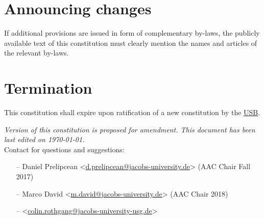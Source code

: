 \section{Announcing changes}
If additional provisions are issued in form of complementary by-laws, the publicly available text of this constitution must clearly mention the names and articles of the relevant by-laws.


\section{Termination}
This constitution shall expire upon ratification of a new constitution by the \hyperref[studentbody]{USB}.


\vfill
\nolinenumbers
\emph{Version  of this constitution is proposed for amendment. This document has been last edited on \today.}\\

Contact for questions and suggestions:
\begin{itemize}[nosep]
\item[--] Daniel Prelipcean <\url{d.prelipcean@jacobs-university.de}> (AAC Chair Fall 2017)
\item[--] Marco David <\url{m.david@jacobs-university.de}> (AAC Chair 2018)
\item[--] <\url{colin.rothgang@jacobs-university-usg.de}>
\end{itemize}